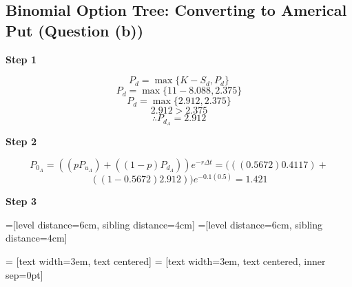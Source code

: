 \documentclass[11pt, english]{article}
\begin{document}
	\newpage

	\subsection{Binomial Option Tree: Converting to Americal Put (Question (b))}

	\textbf{Step 1}

	$$P_d=\max\{K-S_d,P_d\}$$
	$$P_d=\max\{11-8.088,2.375\}$$
	$$P_d=\max\{2.912,2.375\}$$
	$$2.912>2.375$$
	$$\therefore P_{d_A}=2.912$$

	\textbf{Step 2}

	$$P_{0_A}=((pP_{u_A})+((1-p)P_{d_A}))e^{-r\Delta t}=(((0.5672)0.4117)+$$
	$$((1-0.5672)2.912))e^{-0.1(0.5)}=1.421$$

	\textbf{Step 3}	

	=[level distance=6cm, sibling distance=4cm]
        =[level distance=6cm, sibling distance=4cm]

         = [text width=3em, text centered]
         = [text width=3em, text centered, inner sep=0pt]
\end{document}
